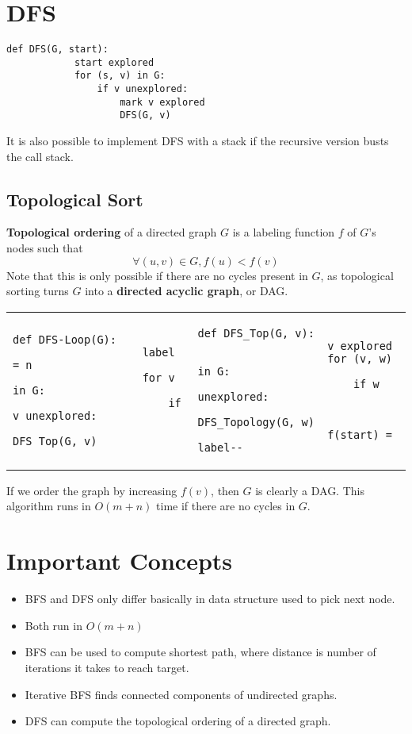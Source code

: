 \documentclass[11pt]{article}
\begin{document}
\section{DFS}
	\begin{lstlisting}[autogobble=true]
		def DFS(G, start):
			start explored
			for (s, v) in G:
				if v unexplored:
					mark v explored
					DFS(G, v)
	\end{lstlisting}
	
	It is also possible to implement DFS with a stack if the recursive version busts the call stack.
	
	\subsection{Topological Sort}
		\textbf{Topological ordering} of a directed graph $G$ is a labeling function $f$ of $G$'s nodes such that
		\begin{equation}
			\forall (u,v)\in G, f(u) < f(v)
		\end{equation}
		Note that this is only possible if there are no cycles present in $G$, as topological sorting turns $G$ into a \textbf{directed acyclic graph}, or DAG.
		
		\begin{center}
		\begin{tabular}{ll}
			\begin{lstlisting}[autogobble=true]
				def DFS-Loop(G):
					label = n
					for v in G:
						if v unexplored:
							DFS_Top(G, v)
			\end{lstlisting} 
			& 
			\begin{lstlisting}[autogobble=true]
				def DFS_Top(G, v):
					v explored
					for (v, w) in G:
						if w unexplored:
							DFS_Topology(G, w)
					f(start) = label--
			\end{lstlisting}
		\end{tabular}
		\end{center}
		
		If we order the graph by increasing $f(v)$, then $G$ is clearly a DAG. This algorithm runs in $O(m+n)$ time if there are no cycles in $G$.
		
\section*{Important Concepts}
	\begin{itemize}
		\item BFS and DFS only differ basically in data structure used to pick next node.
		\item Both run in $O(m+n)$
		\item BFS can be used to compute shortest path, where distance is number of iterations it takes to reach target.
		\item Iterative BFS finds connected components of undirected graphs.
		\item DFS can compute the topological ordering of a directed graph.
	\end{itemize}
\end{document}
